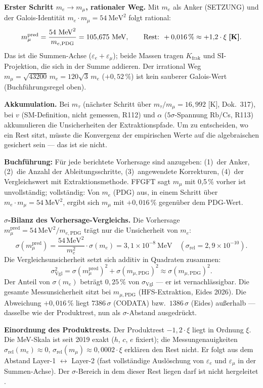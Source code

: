 \textbf{Erster Schritt $m_e\to m_\mu$, rationaler Weg.}
Mit $m_e$ als Anker (SETZUNG) und der Galois-Identität
$m_e\cdot m_\mu=54~\text{MeV}^2$ folgt rational:
\[
m_\mu^\text{pred} = \frac{54~\text{MeV}^2}{m_{e,\text{PDG}}}
= 105{,}675~\text{MeV},\qquad
\text{Rest: }+0{,}016\,\%\approx+1{,}2\cdot\xi\;\textbf{[K]}.
\]
Das ist die Summen-Achse ($\varepsilon_e+\varepsilon_\mu$); beide Massen
tragen $K_\text{frak}$ und SI-Projektion, die sich in der Summe addieren.
Der irrational Weg $m_\mu=\sqrt{43200}\,m_e=120\sqrt{3}\,m_e$
($+0{,}52\,\%$) ist kein sauberer Galois-Wert (Buchführungsregel oben).

\textbf{Akkumulation.} Bei $m_\tau$ (nächster Schritt über $m_\tau/m_\mu=16{,}992$
[K], Dok.~317), bei $v$ (SM-Definition, nicht gemessen, R112) und $\alpha$
($5\sigma$-Spannung Rb/Cs, R113) akkumulieren die Unsicherheiten der
Extraktionspfade. Um zu entscheiden, wo ein Rest sitzt, müsste die Konvergenz
der empirischen Werte auf die algebraischen gesichert sein --- das ist sie nicht.

\textbf{Buchführung:} Für jede berichtete Vorhersage sind anzugeben:
(1)~der Anker, (2)~die Anzahl der Ableitungsschritte, (3)~angewendete
Korrekturen, (4)~der Vergleichswert mit Extraktionsmethode.
\glqq FFGFT sagt $m_\mu$ mit 0{,}5\,\% vorher\grqq{} ist unvollständig;
vollständig: \glqq Von $m_e$ (PDG) aus, in einem Schritt über
$m_e\cdot m_\mu=54~\text{MeV}^2$, ergibt sich $m_\mu$ mit $+0{,}016\,\%$
gegenüber dem PDG-Wert.\grqq


\textbf{$\sigma$-Bilanz des Vorhersage-Vergleichs.}
Die Vorhersage $m_\mu^\text{pred}=54\,\text{MeV}^2/m_{e,\text{PDG}}$
trägt nur die Unsicherheit von $m_e$:
\[
\sigma(m_\mu^\text{pred}) = \frac{54\,\text{MeV}^2}{m_e^2}\cdot\sigma(m_e)
= 3{,}1\times10^{-8}~\text{MeV}\quad(\sigma_\text{rel}=2{,}9\times10^{-10}).
\]
Die Vergleichsunsicherheit setzt sich additiv in Quadraten zusammen:
\[
\sigma_\text{Vgl}^2 = \sigma(m_\mu^\text{pred})^2 + \sigma(m_{\mu,\text{PDG}})^2
\approx \sigma(m_{\mu,\text{PDG}})^2.
\]
Der Anteil von $\sigma(m_e)$ beträgt $0{,}25\,\%$ von $\sigma_\text{Vgl}$ ---
er ist vernachlässigbar. Die gesamte Messunsicherheit sitzt bei
$m_{\mu,\text{PDG}}$ (HFS-Extraktion, Eides 2026). Die Abweichung
$+0{,}016\,\%$ liegt
$7386\,\sigma$ (CODATA) bzw.\ $1386\,\sigma$ (Eides) außerhalb ---
dasselbe wie der Produktrest, nun als $\sigma$-Abstand ausgedrückt.


\textbf{Einordnung des Produktrests.}
Der Produktrest $-1{,}2\cdot\xi$ liegt in Ordnung $\xi$.
Die MeV-Skala ist seit 2019 exakt ($h$, $c$, $e$ fixiert); die
Messungenauigkeiten $\sigma_\text{rel}(m_e)\approx0$, $\sigma_\text{rel}(m_\mu)\approx0{,}0002\cdot\xi$
erklären den Rest nicht. Er folgt aus dem Abstand Layer-1 $\leftrightarrow$
Layer-2 (fast vollständige Auslöschung von $\varepsilon_e$ und
$\varepsilon_\mu$ in der Summen-Achse). Der $\sigma$-Bereich in dem
dieser Rest liegen darf ist nicht hergeleitet \SM.



